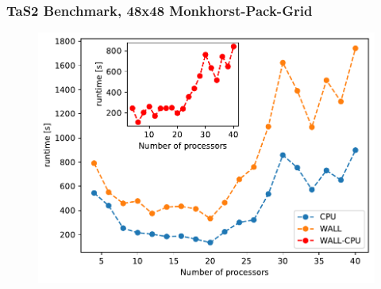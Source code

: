 \documentclass{beamer}
\begin{document}
\begin{frame}
    \frametitle{TaS2 Benchmark, 48x48 Monkhorst-Pack-Grid}
    \begin{figure}
        \includegraphics[width=\linewidth, height=\textheight,keepaspectratio]{TaS2_bench_nprocs_48x48.pdf}
    \end{figure}
\end{frame}
\end{document}
